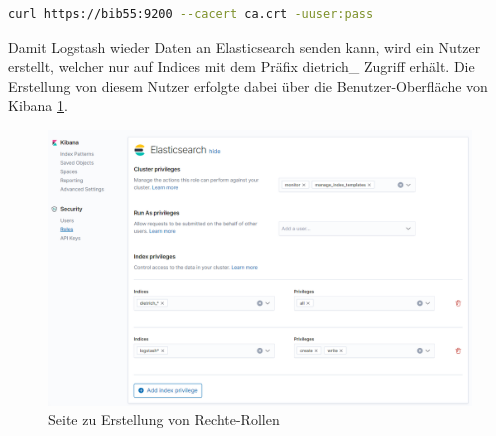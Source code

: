 \begin{lstlisting}[language=BASH, frame=single, label={lst:curlQuery}, caption=Curl-Abfrage an das Elasticsearch-System,captionpos=b] 
curl https://bib55:9200 --cacert ca.crt -uuser:pass
\end{lstlisting}

Damit Logstash wieder Daten an Elasticsearch senden kann, wird ein Nutzer erstellt, welcher nur auf Indices mit dem Präfix dietrich\_ Zugriff erhält. Die Erstellung von diesem Nutzer erfolgte dabei über die Benutzer-Oberfläche von Kibana \ref{img:kibanaRoles}. 

\begin{figure}
	\centering
	\includegraphics[width=1\linewidth]{images/setup/kibana_roles.png}
	\caption{Seite zu Erstellung von Rechte-Rollen}
	\label{img:kibanaRoles}
\end{figure}